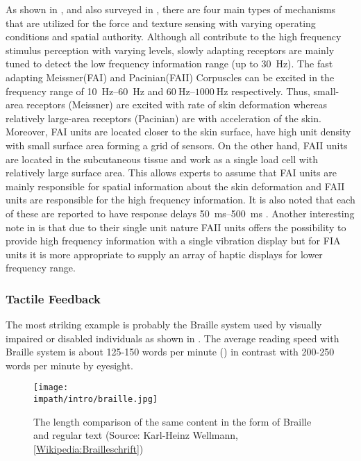 As shown in , and also surveyed in \cite{kontarinis}, there are four main types of mechanisms that are utilized for the force and texture sensing with varying operating conditions and spatial authority. Although all contribute to the high frequency stimulus perception with varying levels, slowly adapting receptors are mainly tuned to detect the low frequency information range (up to \SI{30}{\hertz}). The fast adapting Meissner(FAI) and Pacinian(FAII) Corpuscles can be excited in the frequency range of \SIrange{10}{60}{\hertz} and $\SIrange{60}{1000}{\hertz}$ respectively. Thus, small-area receptors (Meissner) are excited with rate of skin deformation whereas relatively large-area receptors (Pacinian) are with acceleration of the skin. Moreover, FAI units are located closer to the skin surface, have high unit density with small surface area forming a grid of sensors. On the other hand, FAII units are located in the subcutaneous tissue and work as a single load cell with relatively large surface area. This allows experts to assume that FAI units are mainly responsible for spatial information about the skin deformation and FAII units are responsible for the high frequency information. It is also noted that each of these are reported to have response delays \SIrange{50}{500}{\milli\second} \cite{idareview}. Another interesting note in \cite{kontarinis} is that due to their single unit nature FAII units offers the possibility to provide high frequency information with a single vibration display but for FIA units it is more appropriate to supply an array of haptic displays for lower frequency range.  







\subsubsection{Tactile Feedback}
The most striking example is probably the Braille system used by visually impaired or disabled individuals as shown in . The average reading speed with Braille system is about 125-150 words per minute (\cite{americanblind}) in contrast with 200-250 words per minute by eyesight. 

\begin{figure}%
\centering
\texttt{[image: \\impath/intro/braille.jpg]}%
\caption[The length comparison of the same content in the form of Braille and 
regular text]{The length comparison of the same content in the form of Braille and 
regular text (Source: Karl-Heinz Wellmann, 
\href{http://de.wikipedia.org/wiki/Brailleschrift}{[Wikipedia:Brailleschrift]})}%
\label{fig:braille}%
\end{figure}

